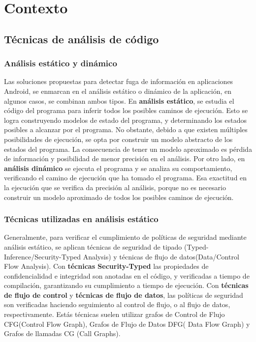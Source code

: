 \section{Contexto}
\subsection{Técnicas de análisis de código}
\subsubsection{Análisis estático y dinámico}
Las soluciones propuestas para detectar fuga de información en aplicaciones
Android, se enmarcan en el análisis estático o dinámico de la aplicación, en
algunos casos, se combinan ambos tipos.\newline 
En \textbf{análisis estático}\cite{Static-dynamic}, se estudia el código del
programa para inferir todos los posibles caminos de ejecución. Esto se logra
construyendo modelos de estado del programa, y determinando los estados posibles
a alcanzar por el programa.
No obstante, debido a que existen múltiples posibilidades de ejecución, se opta
por construir un modelo abstracto de los estados del programa. La consecuencia
de tener un modelo aproximado es pérdida de información y posibilidad de menor
precisión en el análisis.\newline 
Por otro lado, en \textbf{análisis dinámico} se ejecuta el programa y se analiza
su comportamiento, verificando el camino de ejecución que ha tomado el programa.
Esa exactitud en la ejecución que se verifica da precisión al análisis, porque
no es necesario construir un modelo aproximado de todos los posibles caminos de
ejecución.

\subsubsection{Técnicas utilizadas en análisis estático} 
Generalmente, para verificar el cumplimiento de políticas de seguridad mediante
análisis estático, se aplican técnicas de seguridad de tipado
(Typed-Inference/Security-Typed Analysis) y técnicas de flujo de
datos(Data/Control Flow Analysis)\cite{Information-Flow-Java}.\newline 
Con \textbf{técnicas Security-Typed} las propiedades de confidencialidad e
integridad son anotadas en el código, y verificadas a tiempo de compilación,
garantizando su cumplimiento a tiempo de ejecución.\newline 
Con \textbf{técnicas de flujo de control} y \textbf{técnicas de flujo de datos},
las políticas de seguridad son verificadas haciendo seguimiento al control de
flujo, o al flujo de datos, respectivamente. Estás técnicas suelen utilizar
grafos de Control de Flujo CFG(Control Flow Graph), Grafos de Flujo de Datos
DFG( Data Flow Graph) y Grafos de llamadas CG (Call Graphs).

